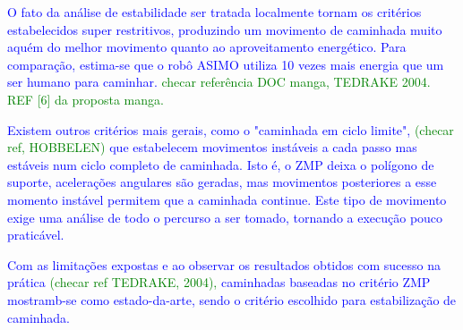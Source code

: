\textcolor{blue}{O fato da análise de estabilidade ser tratada localmente tornam os critérios estabelecidos super restritivos, produzindo um movimento de caminhada muito aquém do melhor movimento quanto ao aproveitamento energético. Para comparação, estima-se que o robô ASIMO utiliza 10 vezes mais energia que um ser humano para caminhar.} \textcolor{green}{checar referência DOC manga, TEDRAKE 2004. REF [6] da proposta manga.} 

\textcolor{blue}{Existem outros critérios mais gerais, como o "caminhada em ciclo limite",} \textcolor{green}{(checar ref, HOBBELEN)} \textcolor{blue}{que estabelecem movimentos instáveis a cada passo mas estáveis num ciclo completo de caminhada. Isto é, o ZMP deixa o polígono de suporte, acelerações angulares são geradas, mas movimentos posteriores a esse momento instável permitem que a caminhada continue. Este tipo de movimento exige uma análise de todo o percurso a ser tomado, tornando a execução pouco praticável.}

\textcolor{blue}{Com as limitações expostas e ao observar os resultados obtidos com sucesso na prática} \textcolor{green}{(checar ref TEDRAKE, 2004),} \textcolor{blue}{caminhadas baseadas no critério ZMP mostramb-se como estado-da-arte, sendo o critério escolhido para estabilização de caminhada.}



